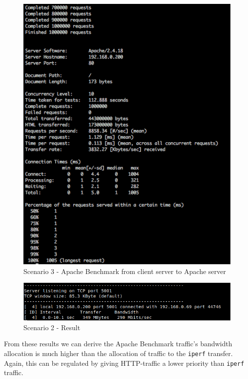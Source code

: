 \documentclass{article}
\begin{document}
\begin{figure}[H]
\includegraphics[width=14cm]{figures/calais-ab.png}
\centering
\caption{Scenario 3 - Apache Benchmark from client server to Apache server}
\centering
\label{fig:ab_calais_scenario_3}
\end{figure}


\begin{figure}[H]
\includegraphics[width=14cm]{figures/q-2-2-3-results.png}
\centering
\caption{Scenario 2 - Result}
\centering
\label{fig:throughput_scenario_3_result}
\end{figure}

From these results we can derive the Apache Benchmark traffic's bandwidth allocation is much higher than the allocation of traffic to the \texttt{iperf} transfer. Again, this can be regulated by giving HTTP-traffic a lower priority than \texttt{iperf} traffic.
\end{document}
